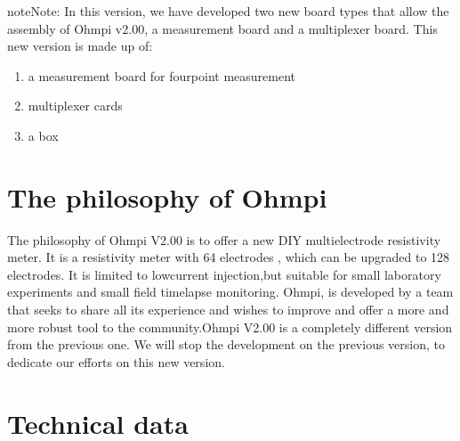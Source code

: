 \documentclass[letterpaper,10pt,english]{sphinxmanual}
\begin{document}
\begin{sphinxadmonition}{note}{Note:}
\sphinxAtStartPar
In this version, we have developed two new board types that allow the assembly of Ohmpi v2.00, a measurement board and a multiplexer board.
This new version is made up of:
\begin{enumerate}
%
\item {} 
\sphinxAtStartPar
a measurement board for four\sphinxhyphen{}point measurement

\item {} 
 multiplexer cards

\item {} 
\sphinxAtStartPar
a box

\end{enumerate}
\end{sphinxadmonition}


\section{The philosophy of Ohmpi}
\label{\detokenize{V2_00:the-philosophy-of-ohmpi}}
\sphinxAtStartPar
The philosophy of Ohmpi V2.00 is to offer a new DIY multielectrode resistivity meter. It is a resistivity meter with 64 electrodes , which can be upgraded to 128 electrodes.
It is limited to low\sphinxhyphen{}current injection,but suitable for small laboratory experiments and small field time\sphinxhyphen{}lapse monitoring.
Ohmpi, is developed by a team that seeks to share all its experience and wishes to improve and offer a more and more robust tool to the community.Ohmpi V2.00 is a completely different version from the previous one.
We will stop the development on the previous version, to dedicate our efforts on this new version.


\section{Technical data}
\label{\detokenize{V2_00:technical-data}}
\end{document}
